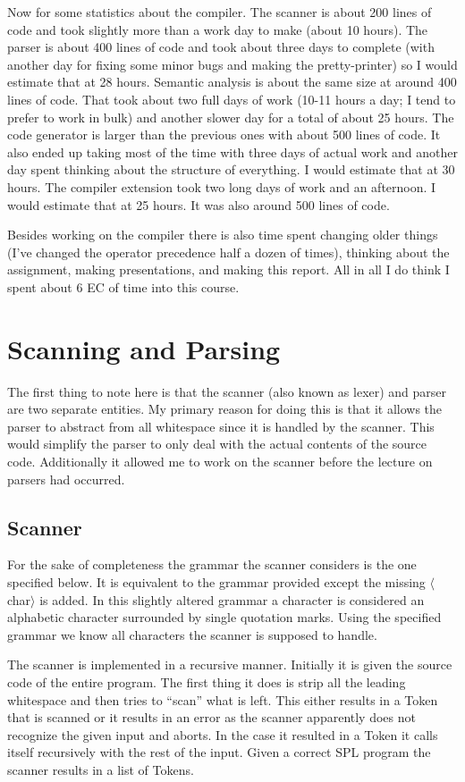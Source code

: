 \documentclass{article}
\begin{document}
Now for some statistics about the compiler. The scanner is about 200 lines of code and took slightly more than a work day to make (about 10 hours). The parser is about 400 lines of code and took about three days to complete (with another day for fixing some minor bugs and making the pretty-printer) so I would estimate that at 28 hours. Semantic analysis is about the same size at around 400 lines of code. That took about two full days of work (10-11 hours a day; I tend to prefer to work in bulk) and another slower day for a total of about 25 hours. The code generator is larger than the previous ones with about 500 lines of code. It also ended up taking most of the time with three days of actual work and another day spent thinking about the structure of everything. I would estimate that at 30 hours. The compiler extension took two long days of work and an afternoon. I would estimate that at 25 hours. It was also around 500 lines of code.

Besides working on the compiler there is also time spent changing older things (I've changed the operator precedence half a dozen of times), thinking about the assignment, making presentations, and making this report. All in all I do think I spent about 6 EC of time into this course.

\section{Scanning and Parsing}
The first thing to note here is that the scanner (also known as lexer) and parser are two separate entities. My primary reason for doing this is that it allows the parser to abstract from all whitespace since it is handled by the scanner. This would simplify the parser to only deal with the actual contents of the source code. Additionally it allowed me to work on the scanner before the lecture on parsers had occurred.

\subsection{Scanner}
For the sake of completeness the grammar the scanner considers is the one specified below. It is equivalent to the grammar provided except the missing $\langle$char$\rangle$ is added. In this slightly altered grammar a character is considered an alphabetic character surrounded by single quotation marks. Using the specified grammar we know all characters the scanner is supposed to handle.

The scanner is implemented in a recursive manner. Initially it is given the source code of the entire program. The first thing it does is strip all the leading whitespace and then tries to ``scan'' what is left. This either results in a Token that is scanned or it results in an error as the scanner apparently does not recognize the given input and aborts. In the case it resulted in a Token it calls itself recursively with the rest of the input. Given a correct SPL program the scanner results in a list of Tokens.
\end{document}
